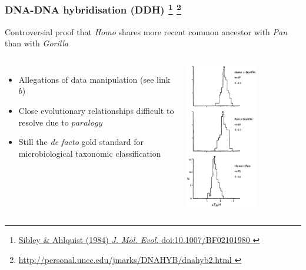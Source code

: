 %
\begin{frame}
  \frametitle{DNA-DNA hybridisation (DDH)
  \footnote{\tiny{\href{http://dx.doi.org/10.1007/BF02101980
}{Sibley \& Ahlquist (1984) \textit{J. Mol. Evol.} doi:10.1007/BF02101980
}}}  
  \footnote{\tiny{\href{http://personal.uncc.edu/jmarks/DNAHYB/dnahyb2.html
}{http://personal.uncc.edu/jmarks/DNAHYB/dnahyb2.html
}}}  
  }
  \textcolor{RawSienna}{Controversial proof that \textit{Homo} shares more recent common ancestor with \textit{Pan} than with \textit{Gorilla}} 
  \begin{columns}[T] 
      \begin{itemize}
        \item \textcolor{hutton_green}{Allegations of data manipulation (see link $b$)}
        \item \textcolor{hutton_blue}{Close evolutionary relationships difficult to resolve due to $paralogy$}        
        \item \textcolor{hutton_purple}{Still the \textit{de facto} gold standard for microbiological taxonomic classification}        
      \end{itemize}
      \includegraphics[width=0.6\textwidth]{images/dna-dna_controversy} \\
  \end{columns}    
\end{frame}